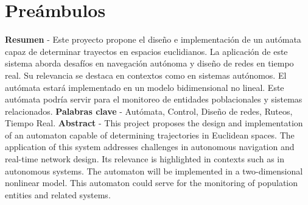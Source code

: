 \chapter{Pre\'ambulos}
\label{sec:seccion_i}
    \textbf{Resumen} - Este proyecto propone el dise\~no e implementaci\'on de un aut\'omata
        capaz de determinar trayectos en espacios euclidianos. La aplicaci\'on de este sistema 
        aborda desaf\'ios en navegaci\'on aut\'onoma y dise\~no de redes en tiempo real.
        Su relevancia se destaca en contextos como en sistemas aut\'onomos. El aut\'omata
        estar\'a implementado en un modelo bidimensional no lineal. Este aut\'omata podr\'ia 
        servir para el monitoreo de entidades poblacionales y sistemas relacionados.
    \vskip 0.5cm    
    \textbf{Palabras clave} - Aut\'omata, Control, Dise\~no de redes, Ruteos, Tiempo Real.
    \vskip 0.5cm
    \textbf{Abstract} - This project proposes the design and implementation of an automaton
        capable of determining trajectories in Euclidean spaces. The application of this system
        addresses challenges in autonomous navigation and real-time network design.
        Its relevance is highlighted in contexts such as in autonomous systems. The automaton
        will be implemented in a two-dimensional nonlinear model. This automaton could
        serve for the monitoring of population entities and related systems.
    
    
